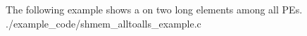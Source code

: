 \begin{apidefinition}
\begin{apiexamples}

\apicexample
    {The following example shows a  on two long elements among
    all \acp{PE}.}
    {./example_code/shmem_alltoalls_example.c}
    {}

\end{apiexamples}

\end{apidefinition}
